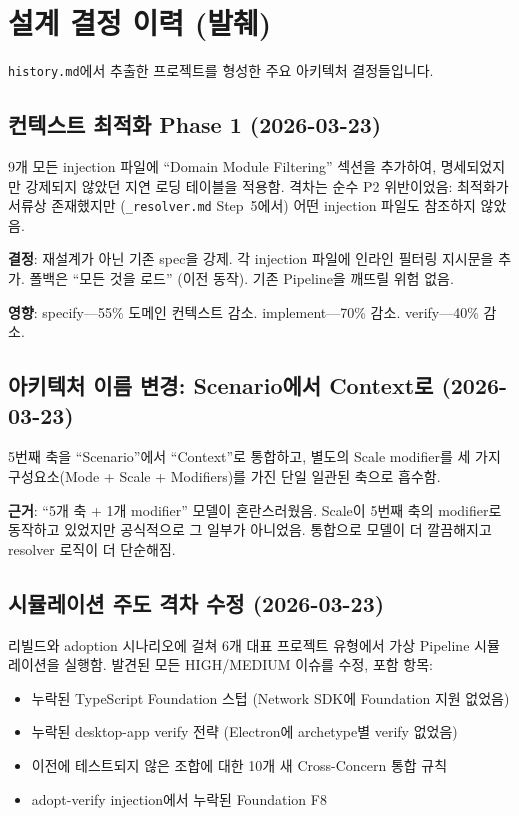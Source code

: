 \documentclass[11pt,a4paper,openright,twoside]{report}
\newcommand{\file}[1]{\texttt{#1}}
\begin{document}
\chapter{설계 결정 이력 (발췌)}
\label{app:history}

\file{history.md}에서 추출한 프로젝트를 형성한 주요 아키텍처 결정들입니다.

\section{컨텍스트 최적화 Phase 1 (2026-03-23)}

9개 모든 injection 파일에 ``Domain Module Filtering'' 섹션을 추가하여, 명세되었지만 강제되지 않았던 지연 로딩 테이블을 적용함. 격차는 순수 P2 위반이었음: 최적화가 서류상 존재했지만 (\file{\_resolver.md} Step~5에서) 어떤 injection 파일도 참조하지 않았음.

\textbf{결정}: 재설계가 아닌 기존 spec을 강제. 각 injection 파일에 인라인 필터링 지시문을 추가. 폴백은 ``모든 것을 로드'' (이전 동작). 기존 Pipeline을 깨뜨릴 위험 없음.

\textbf{영향}: specify---55\% 도메인 컨텍스트 감소. implement---70\% 감소. verify---40\% 감소.

\section{아키텍처 이름 변경: Scenario에서 Context로 (2026-03-23)}

5번째 축을 ``Scenario''에서 ``Context''로 통합하고, 별도의 Scale modifier를 세 가지 구성요소(Mode + Scale + Modifiers)를 가진 단일 일관된 축으로 흡수함.

\textbf{근거}: ``5개 축 + 1개 modifier'' 모델이 혼란스러웠음. Scale이 5번째 축의 modifier로 동작하고 있었지만 공식적으로 그 일부가 아니었음. 통합으로 모델이 더 깔끔해지고 resolver 로직이 더 단순해짐.

\section{시뮬레이션 주도 격차 수정 (2026-03-23)}

리빌드와 adoption 시나리오에 걸쳐 6개 대표 프로젝트 유형에서 가상 Pipeline 시뮬레이션을 실행함. 발견된 모든 HIGH/MEDIUM 이슈를 수정, 포함 항목:

\begin{itemize}
  \item 누락된 TypeScript Foundation 스텁 (Network SDK에 Foundation 지원 없었음)
  \item 누락된 desktop-app verify 전략 (Electron에 archetype별 verify 없었음)
  \item 이전에 테스트되지 않은 조합에 대한 10개 새 Cross-Concern 통합 규칙
  \item adopt-verify injection에서 누락된 Foundation F8
\end{itemize}
\end{document}
